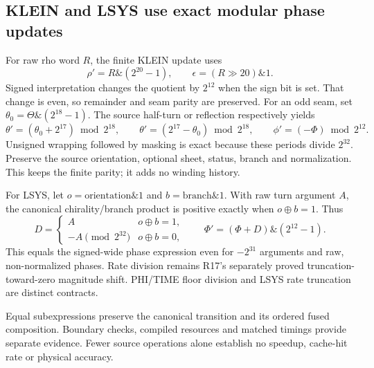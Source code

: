 \subsection{KLEIN and LSYS use exact modular phase updates}
For raw rho word $R$, the finite KLEIN update uses
\begin{equation}
 \rho'=R\mathbin{\&}(2^{20}-1),\qquad
 \epsilon=(R\gg20)\mathbin{\&}1.
\end{equation}
Signed interpretation changes the quotient by $2^{12}$ when the sign bit
is set. That change is even, so remainder and seam parity are preserved.
For an odd seam, set $\theta_0=\Theta\mathbin{\&}(2^{18}-1)$. The source
half-turn or reflection respectively yields
\begin{equation}
 \theta'=(\theta_0+2^{17})\bmod2^{18},\qquad
 \theta'=(2^{17}-\theta_0)\bmod2^{18},\qquad
 \phi'=(-\Phi)\bmod2^{12}.
\end{equation}
Unsigned wrapping followed by masking is exact because these periods divide
$2^{32}$. Preserve the source orientation, optional sheet, status, branch
and normalization. This keeps the finite parity; it adds no winding history.

For LSYS, let $o=\mathrm{orientation}\mathbin{\&}1$ and
$b=\mathrm{branch}\mathbin{\&}1$. With raw turn argument $A$, the canonical
chirality/branch product is positive exactly when $o\oplus b=1$. Thus
\begin{equation}
 D=\begin{cases}A&o\oplus b=1,\\-A\pmod{2^{32}}&o\oplus b=0,\end{cases}
 \qquad\Phi'=(\Phi+D)\mathbin{\&}(2^{12}-1).
\end{equation}
This equals the signed-wide phase expression even for $-2^{31}$ arguments
and raw, non-normalized phases. Rate division remains R17's separately
proved truncation-toward-zero magnitude shift. PHI/TIME floor division
and LSYS rate truncation are distinct contracts.

Equal subexpressions preserve the canonical transition and its ordered
fused composition. Boundary checks, compiled resources and matched timings
provide separate evidence. Fewer source operations alone establish no
speedup, cache-hit rate or physical accuracy.
